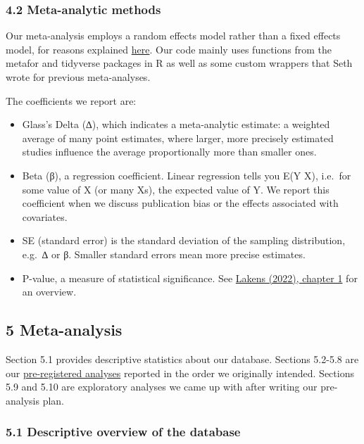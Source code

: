 \documentclass[
  letterpaper,
  DIV=11,
  numbers=noendperiod]{scrartcl}
\providecommand{\tightlist}{%
  \setlength{\itemsep}{0pt}\setlength{\parskip}{0pt}}\usepackage{longtable,booktabs,array}
\begin{document}
\hypertarget{meta-analytic-methods-1}{%
\subsubsection{4.2 Meta-analytic
methods}\label{meta-analytic-methods-1}}

Our meta-analysis employs a random effects model rather than a fixed
effects model, for reasons explained
\href{https://www.ncbi.nlm.nih.gov/pmc/articles/PMC9393987/}{here}. Our
code mainly uses functions from the metafor and tidyverse packages in R
as well as some custom wrappers that Seth wrote for previous
meta-analyses.

The coefficients we report are:

\begin{itemize}
\tightlist
\item
  Glass's Delta (∆), which indicates a meta-analytic estimate: a
  weighted average of many point estimates, where larger, more precisely
  estimated studies influence the average proportionally more than
  smaller ones.
\item
  Beta (β), a regression coefficient. Linear regression tells you E(Y
  \textbar{} X), i.e.~for some value of X (or many Xs), the expected
  value of Y. We report this coefficient when we discuss publication
  bias or the effects associated with covariates.
\item
  SE (standard error) is the standard deviation of the sampling
  distribution, e.g.~∆ or β. Smaller standard errors mean more precise
  estimates.
\item
  P-value, a measure of statistical significance. See
  \href{https://lakens.github.io/statistical_inferences/01-pvalue.html}{Lakens
  (2022), chapter 1} for an overview.
\end{itemize}

\hypertarget{meta-analysis}{%
\subsection{5 Meta-analysis}\label{meta-analysis}}

Section 5.1 provides descriptive statistics about our database. Sections
5.2-5.8 are our \href{https://osf.io/3sth2}{pre-registered analyses}
reported in the order we originally intended. Sections 5.9 and 5.10 are
exploratory analyses we came up with after writing our pre-analysis
plan.

\hypertarget{descriptive-overview-of-the-database}{%
\subsubsection{5.1 Descriptive overview of the
database}\label{descriptive-overview-of-the-database}}
\end{document}
